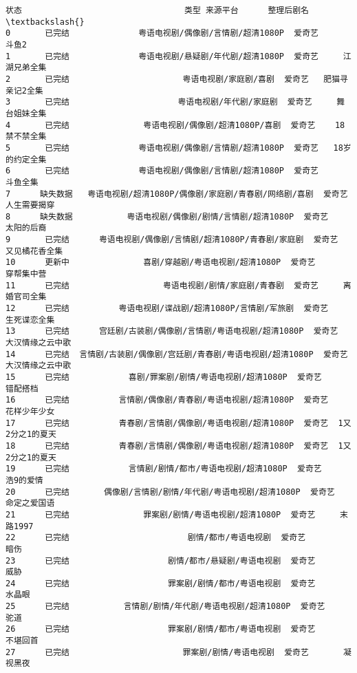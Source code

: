 \documentclass[11pt]{article}
\begin{document}
\begin{Verbatim}[commandchars=\\\{\}]
         状态                                 类型 来源平台      整理后剧名  \textbackslash{}
0       已完结              粤语电视剧/偶像剧/言情剧/超清1080P  爱奇艺        斗鱼2   
1       已完结              粤语电视剧/悬疑剧/年代剧/超清1080P  爱奇艺     江湖兄弟全集   
2       已完结                       粤语电视剧/家庭剧/喜剧  爱奇艺   肥猫寻亲记2全集   
3       已完结                      粤语电视剧/年代剧/家庭剧  爱奇艺     舞台姐妹全集   
4       已完结               粤语电视剧/偶像剧/超清1080P/喜剧  爱奇艺    18禁不禁全集   
5       已完结              粤语电视剧/偶像剧/言情剧/超清1080P  爱奇艺   18岁的约定全集   
6       已完结              粤语电视剧/偶像剧/言情剧/超清1080P  爱奇艺       斗鱼全集   
7      缺失数据   粤语电视剧/超清1080P/偶像剧/家庭剧/青春剧/网络剧/喜剧  爱奇艺     人生需要揭穿   
8      缺失数据           粤语电视剧/偶像剧/剧情/言情剧/超清1080P  爱奇艺      太阳的后裔   
9       已完结      粤语电视剧/偶像剧/言情剧/超清1080P/青春剧/家庭剧  爱奇艺    又见橘花香全集   
10      更新中               喜剧/穿越剧/粤语电视剧/超清1080P  爱奇艺      穿帮集中营   
11      已完结                   粤语电视剧/剧情/家庭剧/青春剧  爱奇艺     离婚官司全集   
12      已完结          粤语电视剧/谍战剧/超清1080P/言情剧/军旅剧  爱奇艺     生死谍恋全集   
13      已完结      宫廷剧/古装剧/偶像剧/言情剧/粤语电视剧/超清1080P  爱奇艺   大汉情缘之云中歌   
14      已完结  言情剧/古装剧/偶像剧/宫廷剧/青春剧/粤语电视剧/超清1080P  爱奇艺   大汉情缘之云中歌   
15      已完结            喜剧/罪案剧/剧情/粤语电视剧/超清1080P  爱奇艺       错配搭档   
16      已完结          言情剧/偶像剧/青春剧/粤语电视剧/超清1080P  爱奇艺     花样少年少女   
17      已完结          青春剧/言情剧/偶像剧/粤语电视剧/超清1080P  爱奇艺  1又2分之1的夏天   
18      已完结          青春剧/言情剧/偶像剧/粤语电视剧/超清1080P  爱奇艺  1又2分之1的夏天   
19      已完结            言情剧/剧情/都市/粤语电视剧/超清1080P  爱奇艺      浩9的爱情   
20      已完结       偶像剧/言情剧/剧情/年代剧/粤语电视剧/超清1080P  爱奇艺     命定之爱国语   
21      已完结               罪案剧/剧情/粤语电视剧/超清1080P  爱奇艺     末路1997   
22      已完结                        剧情/都市/粤语电视剧  爱奇艺         暗伤   
23      已完结                    剧情/都市/悬疑剧/粤语电视剧  爱奇艺         威胁   
24      已完结                    罪案剧/剧情/都市/粤语电视剧  爱奇艺        水晶眼   
25      已完结           言情剧/剧情/年代剧/粤语电视剧/超清1080P  爱奇艺         驼道   
26      已完结                    罪案剧/剧情/都市/粤语电视剧  爱奇艺       不堪回首   
27      已完结                       罪案剧/剧情/粤语电视剧  爱奇艺       凝视黑夜   

\end{Verbatim}
\end{document}
